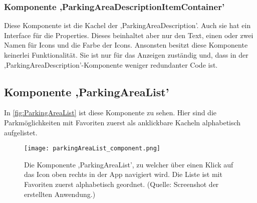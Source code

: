 \subsubsection{Komponente ,ParkingAreaDescriptionItemContainer'}
\label{parkingAreaDescriptionItemContainer}
Diese Komponente ist die Kachel der ,ParkingAreaDescription'. Auch sie hat ein Interface für die Properties. Dieses beinhaltet aber nur den Text, einen oder zwei Namen für Icons und die Farbe der Icons. Ansonsten besitzt diese Komponente keinerlei Funktionalität. Sie ist nur für das Anzeigen zuständig und, dass in der ,ParkingAreaDescription'-Komponente weniger redundanter Code ist.

\subsection{Komponente ,ParkingAreaList'}
\label{parkingAreaList}
In \autoref{fig:ParkingAreaList} ist diese Komponente zu sehen. Hier sind die Parkmöglichkeiten mit Favoriten zuerst als anklickbare Kacheln alphabetisch aufgelistet. 
\begin{figure}[h!]
	\centering
	\texttt{[image: parkingAreaList\_component.png]}
	\caption[Die Komponente ,ParkingAreaList', zu welcher über einen Klick auf das Icon oben rechts in der App navigiert wird. Die Liste ist mit Favoriten zuerst alphabetisch geordnet.]
	{Die Komponente ,ParkingAreaList', zu welcher über einen Klick auf das Icon oben rechts in der App navigiert wird. Die Liste ist mit Favoriten zuerst alphabetisch geordnet. (Quelle: Screenshot der erstellten Anwendung.)}
	\label{fig:ParkingAreaList}
\end{figure}


